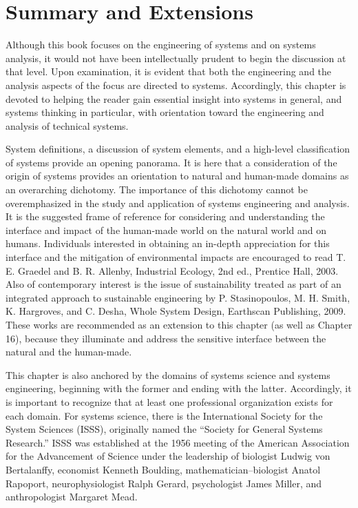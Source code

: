 \section{Summary and Extensions}

Although this book focuses on the engineering of systems and on systems analysis, it would not have been intellectually prudent to begin the discussion at that level. Upon examination, it is evident that both the engineering and the analysis aspects of the focus are directed to systems. Accordingly, this chapter is devoted to helping the reader gain essential insight into systems in general, and systems thinking in particular, with orientation toward the engineering and analysis of technical systems.

System definitions, a discussion of system elements, and a high-level classification of systems provide an opening panorama. It is here that a consideration of the origin of systems provides an orientation to natural and human-made domains as an overarching dichotomy. The importance of this dichotomy cannot be overemphasized in the study and application of systems engineering and analysis. It is the suggested frame of reference for considering and understanding the interface and impact of the human-made world on the natural world and on humans. Individuals interested in obtaining an in-depth appreciation for this interface and the mitigation of environmental impacts are encouraged to read T. E. Graedel and B. R. Allenby, Industrial Ecology, 2nd ed., Prentice Hall, 2003. Also of contemporary interest is the issue of sustainability treated as part of an integrated approach to sustainable engineering by P. Stasinopoulos, M. H. Smith, K. Hargroves, and C. Desha, Whole System Design, Earthscan Publishing, 2009. These works are recommended as an extension to this chapter (as well as Chapter 16), because they illuminate and address the sensitive interface between the natural and the human-made.

This chapter is also anchored by the domains of systems science and systems engineering, beginning with the former and ending with the latter. Accordingly, it is important to recognize that at least one professional organization exists for each domain. For systems science, there is the International Society for the System Sciences (ISSS), originally named the “Society for General Systems Research.” ISSS was established at the 1956 meeting of the American Association for the Advancement of Science under the leadership of biologist Ludwig von Bertalanffy, economist Kenneth Boulding, mathematician–biologist Anatol Rapoport, neurophysiologist Ralph Gerard, psychologist James Miller, and anthropologist Margaret Mead.


